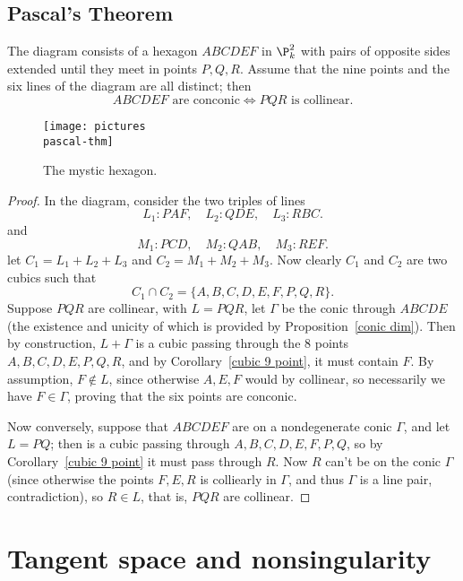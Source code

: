 \subsection{Pascal's Theorem}
\begin{proposition}
The diagram consists of a hexagon $ABCDEF$ in $\P^2_k$ with pairs of opposite sides extended until they meet in points $P,Q,R$. Assume that the nine points and the six lines of the diagram are all distinct; then
\[\text{$ABCDEF$ are conconic}\iff\text{$PQR$ is collinear}.\]
\end{proposition}
\begin{figure}[htbp]
\centering
\texttt{[image: pictures\\pascal-thm]}
\caption{The mystic hexagon.}
\end{figure}
\begin{proof}
In the diagram, consider the two triples of lines
\[L_1:PAF,\quad L_2:QDE,\quad L_3:RBC.\]
and 
\[M_1:PCD,\quad M_2:QAB,\quad M_3:REF.\]
let $C_1=L_1+L_2+L_3$ and $C_2=M_1+M_2+M_3$. Now clearly $C_1$ and $C_2$ are two cubics such that
\[C_1\cap C_2=\{A,B,C,D,E,F,P,Q,R\}.\]
Suppose $PQR$ are collinear, with $L=PQR$, let $\Gamma$ be the conic through $ABCDE$ (the existence and unicity of which is provided by Proposition~\ref{conic dim}). Then by construction, $L+\Gamma$ is a cubic passing through the $8$ points $A,B,C,D,E,P,Q,R$, and by Corollary~\ref{cubic 9 point}, it must contain $F$. By assumption, $F\notin L$, since otherwise $A,E,F$ would by collinear, so necessarily we have $F\in\Gamma$, proving that the six points are conconic.\par
Now conversely, suppose that $ABCDEF$ are on a nondegenerate conic $\Gamma$, and let $L=PQ$; then is a cubic passing through $A,B,C,D,E,F,P,Q$, so by Corollary~\ref{cubic 9 point} it must pass through $R$. Now $R$ can't be on the conic $\Gamma$ (since otherwise the points $F,E,R$ is colliearly in $\Gamma$, and thus $\Gamma$ is a line pair, contradiction), so $R\in L$, that is, $PQR$ are collinear.
\end{proof}
\section{Tangent space and nonsingularity}
